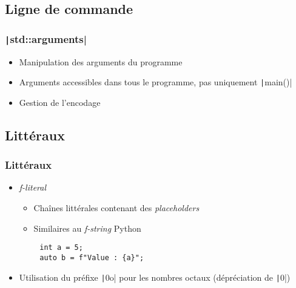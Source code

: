\documentclass[C++.tex]{subfiles}
\begin{document}
\subsection*{Ligne de commande}
\begin{frame}[fragile]
	\frametitle{\texttt|std::arguments|}
	\begin{itemize}
		\item Manipulation des arguments du programme
		\item Arguments accessibles dans tous le programme, pas uniquement \texttt|main()|
		\item Gestion de l'encodage
	\end{itemize}

\end{frame}

\subsection*{Littéraux}
\begin{frame}[fragile]
	\frametitle{Littéraux}
	\begin{itemize}
		\item \textit{f-literal}
		\begin{itemize}
			\item Chaînes littérales contenant des \textit{placeholders}
			\item Similaires au \textit{f-string} Python
		\end{itemize}
	\end{itemize}

	\begin{verbatim}
		int a = 5;
		auto b = f"Value : {a}";
	\end{verbatim}

	\begin{itemize}
		\item Utilisation du préfixe \texttt|0o| pour les nombres octaux (dépréciation de \texttt|0|)
	\end{itemize}

\end{frame}
\end{document}
